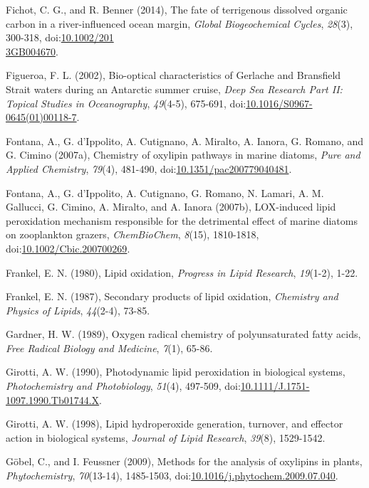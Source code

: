 \begin{singlespace}
{{Fichot, C. G., and R. Benner (2014), The fate of terrigenous dissolved organic carbon in a river-influenced ocean margin, \emph{Global Biogeochemical Cycles}, \emph{28}(3), 300-318, doi:\href{http://dx.doi.org/10.1002/2013GB004670}{10.1002/201\\3GB004670}.

Figueroa, F. L. (2002), Bio-optical characteristics of Gerlache and Bransfield Strait waters during an Antarctic summer cruise, \emph{Deep Sea Research Part II: Topical Studies in Oceanography}, \emph{49}(4-5), 675-691, doi:\href{http://dx.doi.org/10.1016/S0967-0645(01)00118-7}{10.1016/S0967-0645(01)00118-7}.

Fontana, A., G. d'Ippolito, A. Cutignano, A. Miralto, A. Ianora, G. Romano, and G. Cimino (2007a), Chemistry of oxylipin pathways in marine diatoms, \emph{Pure and Applied Chemistry}, \emph{79}(4), 481-490, doi:\href{http://dx.doi.org/10.1351/pac200779040481}{10.1351/pac200779040481}.

Fontana, A., G. d'Ippolito, A. Cutignano, G. Romano, N. Lamari, A. M. Gallucci, G. Cimino, A. Miralto, and A. Ianora (2007b), LOX-induced lipid peroxidation mechanism responsible for the detrimental effect of marine diatoms on zooplankton grazers, \emph{ChemBioChem}, \emph{8}(15), 1810-1818, doi:\href{http://dx.doi.org/10.1002/Cbic.200700269}{10.1002/Cbic.200700269}.

Frankel, E. N. (1980), Lipid oxidation, \emph{Progress in Lipid Research}, \emph{19}(1-2), 1-22.

Frankel, E. N. (1987), Secondary products of lipid oxidation, \emph{Chemistry and Physics of Lipids}, \emph{44}(2-4), 73-85.

Gardner, H. W. (1989), Oxygen radical chemistry of polyunsaturated fatty acids, \emph{Free Radical Biology and Medicine}, \emph{7}(1), 65-86.

Girotti, A. W. (1990), Photodynamic lipid peroxidation in biological systems, \emph{Photochemistry and Photobiology}, \emph{51}(4), 497-509, doi:\href{http://dx.doi.org/10.1111/J.1751-1097.1990.Tb01744.X}{10.1111/J.1751-1097.1990.Tb01744.X}.

Girotti, A. W. (1998), Lipid hydroperoxide generation, turnover, and effector action in biological systems, \emph{Journal of Lipid Research}, \emph{39}(8), 1529-1542.

G\"{o}bel, C., and I. Feussner (2009), Methods for the analysis of oxylipins in plants, \emph{Phytochemistry}, \emph{70}(13-14), 1485-1503, doi:\href{http://dx.doi.org/10.1016/j.phytochem.2009.07.040}{10.1016/j.phytochem.2009.07.040}.

}}
\end{singlespace}
